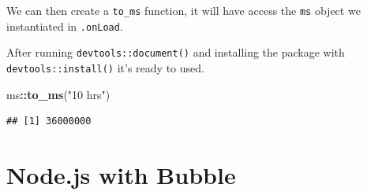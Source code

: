 \documentclass[
]{krantz}
\makeatletter
\newenvironment{Shaded}{\begin{snugshade}}{\end{snugshade}}
\newcommand{\CommentTok}[1]{\textcolor[rgb]{0.37,0.37,0.37}{\textit{#1}}}
\newcommand{\ControlFlowTok}[1]{\textcolor[rgb]{0.27,0.27,0.27}{\textbf{#1}}}
\newcommand{\DataTypeTok}[1]{\textcolor[rgb]{0.27,0.27,0.27}{#1}}
\newcommand{\KeywordTok}[1]{\textcolor[rgb]{0.27,0.27,0.27}{\textbf{#1}}}
\newcommand{\NormalTok}[1]{#1}
\newcommand{\OperatorTok}[1]{\textcolor[rgb]{0.43,0.43,0.43}{\textbf{#1}}}
\newcommand{\OtherTok}[1]{\textcolor[rgb]{0.37,0.37,0.37}{#1}}
\newcommand{\StringTok}[1]{\textcolor[rgb]{0.5,0.5,0.5}{#1}}
\newenvironment{kframe}{%
\medskip{}
\setlength{\fboxsep}{.8em}
 \def\at@end@of@kframe{}%
 \ifinner\ifhmode%
  \def\at@end@of@kframe{\end{minipage}}%
  \begin{minipage}{\columnwidth}%
 \fi\fi%
 \def\FrameCommand##1{\hskip\@totalleftmargin \hskip-\fboxsep
 \colorbox{shadecolor}{##1}\hskip-\fboxsep
     \hskip-\linewidth \hskip-\@totalleftmargin \hskip\columnwidth}%
 \MakeFramed {\advance\hsize-\width
   \@totalleftmargin\z@ \linewidth\hsize
   \@setminipage}}%
 {\par\unskip\endMakeFramed%
 \at@end@of@kframe}
\renewenvironment{Shaded}{\begin{kframe}}{\end{kframe}}
\makeatother
\begin{document}
\begin{Shaded}
\end{Shaded}

We can then create a \texttt{to\_ms} function, it will have access the \texttt{ms} object we instantiated in \texttt{.onLoad}.

\begin{Shaded}
\end{Shaded}

After running \texttt{devtools::document()} and installing the package with \texttt{devtools::install()} it's ready to used.

\begin{Shaded}
\begin{Highlighting}[]
\NormalTok{ms}\OperatorTok{::}\KeywordTok{to\_ms}\NormalTok{(}\StringTok{"10 hrs"}\NormalTok{)}
\end{Highlighting}
\end{Shaded}

\begin{verbatim}
## [1] 36000000
\end{verbatim}

\hypertarget{node}{%
\chapter{Node.js with Bubble}\label{node}}
\end{document}
